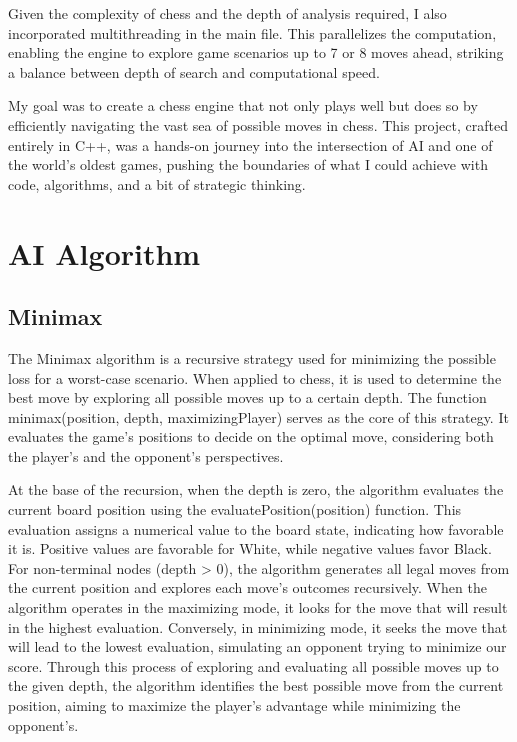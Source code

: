 \documentclass{article}
\begin{document}
Given the complexity of chess and the depth of analysis required, I also incorporated multithreading in the main file. This parallelizes the computation, enabling the engine to explore game scenarios up to 7 or 8 moves ahead, striking a balance between depth of search and computational speed.

My goal was to create a chess engine that not only plays well but does so by efficiently navigating the vast sea of possible moves in chess. This project, crafted entirely in C++, was a hands-on journey into the intersection of AI and one of the world's oldest games, pushing the boundaries of what I could achieve with code, algorithms, and a bit of strategic thinking.
%



\section{AI Algorithm}
\subsection{Minimax}

The Minimax algorithm is a recursive strategy used for minimizing the possible loss for a worst-case scenario. When applied to chess, it is used to determine the best move by exploring all possible moves up to a certain depth. The function minimax(position, depth, maximizingPlayer) serves as the core of this strategy. It evaluates the game's positions to decide on the optimal move, considering both the player's and the opponent's perspectives.

At the base of the recursion, when the depth is zero, the algorithm evaluates the current board position using the evaluatePosition(position) function. This evaluation assigns a numerical value to the board state, indicating how favorable it is. Positive values are favorable for White, while negative values favor Black. For non-terminal nodes (depth > 0), the algorithm generates all legal moves from the current position and explores each move's outcomes recursively. When the algorithm operates in the maximizing mode, it looks for the move that will result in the highest evaluation. Conversely, in minimizing mode, it seeks the move that will lead to the lowest evaluation, simulating an opponent trying to minimize our score. Through this process of exploring and evaluating all possible moves up to the given depth, the algorithm identifies the best possible move from the current position, aiming to maximize the player's advantage while minimizing the opponent's.
\end{document}
